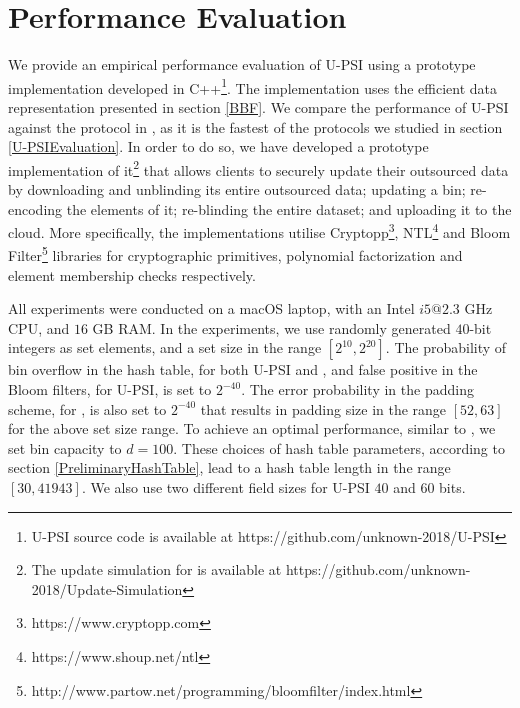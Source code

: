 

\section{Performance Evaluation}

We provide an empirical performance evaluation of U-PSI using  a prototype implementation developed in C++\footnote{\scriptsize U-PSI source code is available at  https://github.com/unknown-2018/U-PSI}. The implementation uses the efficient data representation presented in section \ref{BBF}. We compare the performance of U-PSI against  the protocol in \cite{eopsi}, as it is the fastest of the protocols we studied in section \ref{U-PSIEvaluation}. In order to do so, we have developed a prototype implementation of it\footnote{\scriptsize The update simulation for \cite{eopsi}  is available at \scriptsize https://github.com/unknown-2018/Update-Simulation} that allows clients to securely update their outsourced data by downloading and unblinding its entire outsourced data; updating a bin; re-encoding the elements of it; re-blinding the entire dataset; and uploading it to the cloud. More specifically, the implementations utilise  Cryptopp\footnote{\scriptsize https://www.cryptopp.com}, NTL\footnote{\scriptsize https://www.shoup.net/ntl} and Bloom Filter\footnote{\scriptsize http://www.partow.net/programming/bloomfilter/index.html} libraries  for   cryptographic primitives,  polynomial factorization and element membership checks respectively.

All experiments were conducted on a macOS laptop, with an Intel $i5@2.3$ GHz CPU, and $16$ GB RAM. In the experiments, we use randomly generated $40$-bit integers as set elements, and a set size in the range $[2^{\scriptscriptstyle 10},2^{\scriptscriptstyle 20}]$. The probability of bin overflow in the hash table, for both U-PSI and \cite{eopsi}, and false positive in the Bloom filters, for U-PSI, is set to $2^{\scriptscriptstyle -40}$. The error probability in the padding scheme, for \cite{eopsi}, is also set to $2^{\scriptscriptstyle -40}$  that results in padding size in the range $[52,63]$ for the above set size  range. To achieve an optimal performance, similar to \cite{eopsi}, we set bin capacity to $d=100$. These choices of hash table parameters, according to section \ref{PreliminaryHashTable}, lead to a hash table length in the range $[30,41943]$. We also use two different field sizes for U-PSI $40$ and $60$ bits. 

